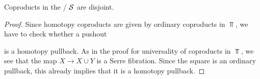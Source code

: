 \begin{lemma}
    Coproducts in the \inftycat/ $\mathcal{S}$ are disjoint.
    \begin{proof}
        Since homotopy coproducts are given by ordinary coproducts in $\Top$, we have to check whether a pushout
        \begin{center}
        \end{center}
        is a homotopy pullback.
        As in the proof for universality of coproducts in $\Top$, we see that the map $X\to X\cup Y$ is a Serre fibration.
        Since the square is an ordinary pullback, this already implies that it is a homotopy pullback.
    \end{proof}
\end{lemma}
